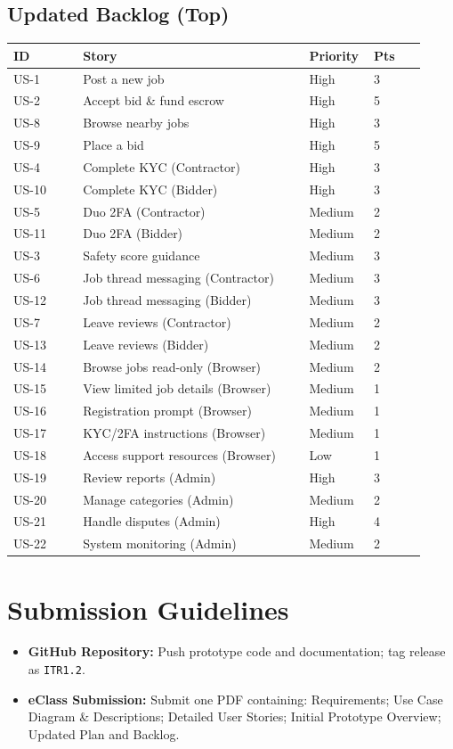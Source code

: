 \documentclass[11pt]{article}
\begin{document}
\subsection{Updated Backlog (Top)}
\begin{longtable}{@{}p{0.16\linewidth} p{0.52\linewidth} p{0.12\linewidth} p{0.12\linewidth}@{}}
\toprule
\textbf{ID} & \textbf{Story} & \textbf{Priority} & \textbf{Pts} \\
\midrule
US-1 & Post a new job & High & 3 \\
US-2 & Accept bid \& fund escrow & High & 5 \\
US-8 & Browse nearby jobs & High & 3 \\
US-9 & Place a bid & High & 5 \\
US-4 & Complete KYC (Contractor) & High & 3 \\
US-10 & Complete KYC (Bidder) & High & 3 \\
US-5 & Duo 2FA (Contractor) & Medium & 2 \\
US-11 & Duo 2FA (Bidder) & Medium & 2 \\
US-3 & Safety score guidance & Medium & 3 \\
US-6 & Job thread messaging (Contractor) & Medium & 3 \\
US-12 & Job thread messaging (Bidder) & Medium & 3 \\
US-7 & Leave reviews (Contractor) & Medium & 2 \\
US-13 & Leave reviews (Bidder) & Medium & 2 \\
US-14 & Browse jobs read-only (Browser) & Medium & 2 \\
US-15 & View limited job details (Browser) & Medium & 1 \\
US-16 & Registration prompt (Browser) & Medium & 1 \\
US-17 & KYC/2FA instructions (Browser) & Medium & 1 \\
US-18 & Access support resources (Browser) & Low & 1 \\
US-19 & Review reports (Admin) & High & 3 \\
US-20 & Manage categories (Admin) & Medium & 2 \\
US-21 & Handle disputes (Admin) & High & 4 \\
US-22 & System monitoring (Admin) & Medium & 2 \\
\bottomrule
\end{longtable}

\section{Submission Guidelines}
\begin{itemize}[leftmargin=1.4em]
  \item \textbf{GitHub Repository:} Push prototype code and documentation; tag release as \texttt{ITR1.2}.
  \item \textbf{eClass Submission:} Submit one PDF containing: Requirements; Use Case Diagram \& Descriptions; Detailed User Stories; Initial Prototype Overview; Updated Plan and Backlog.
\end{itemize}
\end{document}
